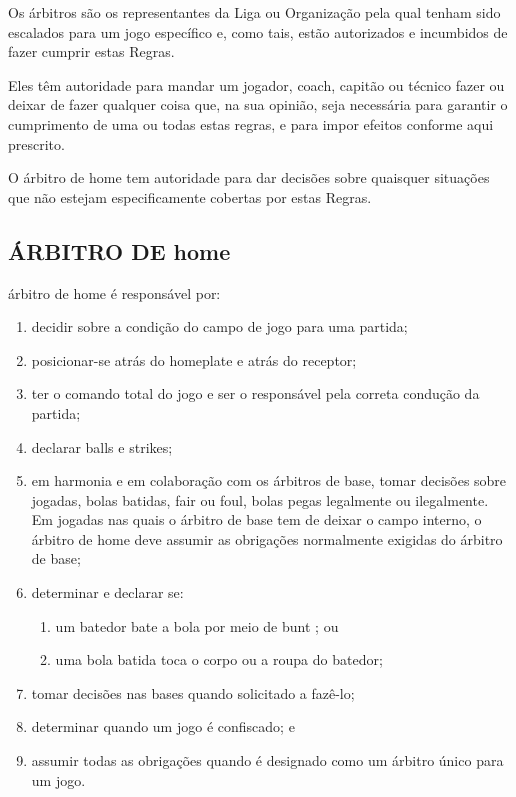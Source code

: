 Os árbitros são os representantes da Liga ou Organização pela qual tenham sido escalados para um jogo específico e, como tais, estão autorizados e incumbidos de fazer cumprir estas Regras.

Eles têm autoridade para mandar um jogador, \gls{coach}, capitão ou técnico fazer ou deixar de fazer qualquer coisa que, na sua  opinião, seja necessária para garantir o cumprimento de uma ou todas estas regras, e para impor efeitos conforme aqui prescrito.

O árbitro de \gls{home} tem  autoridade para dar decisões sobre quaisquer situações que não estejam  especificamente cobertas por estas Regras.

\subsection{\'ARBITRO DE \gls{home}}

árbitro de \gls{home} é responsável por:
\begin{enumerate}[label=(\alph*)]
	\item decidir sobre a condição do campo de jogo para uma partida;
	\item posicionar-se atrás do \gls{homeplate} e atrás do receptor;
	\item ter o comando total do jogo e ser o responsável pela correta condução da partida;
	\item declarar \glspl{ball} e \glspl{strike};
	\item em harmonia e em colaboração com os árbitros de base, tomar decisões sobre jogadas, bolas batidas, \gls{fair} ou \gls{foul}, bolas pegas legalmente ou ilegalmente. Em jogadas nas quais o árbitro de base tem de deixar o campo interno, o árbitro de \gls{home} deve assumir as obrigações normalmente exigidas do árbitro de base;
	\item determinar e declarar se:
	\begin{enumerate}[label=\roman*.]
		\item um batedor bate a bola por meio de \gls{bunt} ; ou
		\item uma bola batida toca o corpo ou a roupa do batedor;
	\end{enumerate}
	\item tomar decisões nas bases quando solicitado a fazê-lo;
	\item determinar quando um jogo é confiscado; e
	\item assumir todas as obrigações quando é designado como um árbitro único para um jogo.
\end{enumerate}

